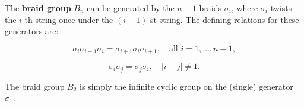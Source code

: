 The \textbf{braid group} $B_n$ can be generated by the $n-1$ braids $\sigma_i$, where $\sigma_i$ twists the $i$-th string once under the $(i+1)$-st string. The defining relations for these generators are:

$$\sigma_i \sigma_{i+1} \sigma_i = \sigma_{i+1} \sigma_i \sigma_{i+1}, \quad \text{all } i = 1, \ldots, n-1,$$

$$\sigma_i \sigma_j = \sigma_j \sigma_i, \quad |i-j| \neq 1.$$

The braid group $B_2$ is simply the infinite cyclic group on the (single) generator $\sigma_1$.
